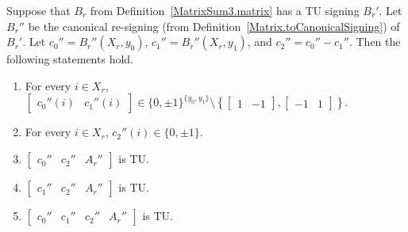 \begin{lemma}
    \label{MatrixSum3.HasTuBr.cccAr_isTotallyUnimodular}
    \leanok
    Suppose that $B_{r}$ from Definition~\ref{MatrixSum3.matrix} has a TU signing $B_{r}'$. Let $B_{r}''$ be the canonical re-signing (from Definition~\ref{Matrix.toCanonicalSigning}) of $B_{r}'$. Let $c_{0}'' = B_{r}'' (X_{r}, y_{0})$, $c_{1}'' = B_{r}'' (X_{r}, y_{1})$, and $c_{2}'' = c_{0}'' - c_{1}''$. Then the following statements hold.
    \begin{enumerate}
        \item\label{item:tss_Brp_c01} For every $i \in X_{r}$, $\begin{bmatrix} c_{0}'' (i) & c_{1}'' (i) \end{bmatrix} \in \{0, \pm 1\}^{\{y_{0}, y_{1}\}} \setminus \left\{ \begin{bmatrix} 1 & -1 \end{bmatrix}, \begin{bmatrix} -1 & 1 \end{bmatrix} \right\}$.
        \item\label{item:tss_Brp_c2} For every $i \in X_{r}$, $c_{2}'' (i) \in \{0, \pm 1\}$.
        \item\label{item:tss_Brp_tu1} $\begin{bmatrix} c_{0}'' & c_{2}'' & A_{r}'' \end{bmatrix}$ is TU.
        \item\label{item:tss_Brp_tu2} $\begin{bmatrix} c_{1}'' & c_{2}'' & A_{r}'' \end{bmatrix}$ is TU.
        \item\label{item:tss_Brp_tu3} $\begin{bmatrix} c_{0}'' & c_{1}'' & c_{2}'' & A_{r}'' \end{bmatrix}$ is TU.
    \end{enumerate}
\end{lemma}

